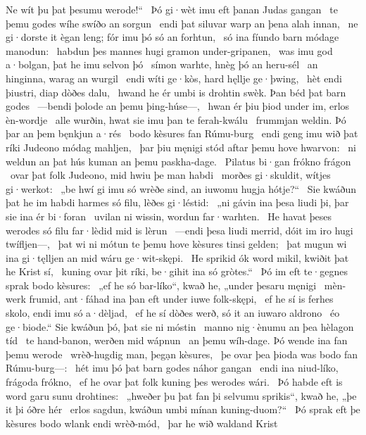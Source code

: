 Ne wít þu þat þesumu werode!“ \hld\ Þó gi·wèt imu eft þanan
Judas gangan \hld\ te þemu godes wíhe
swíðo an sorgun \hld\ endi þat siluvar warp
an þena alah innan, \hld\ ne gi·dorste it ègan leng;
fór imu þó só an forhtun, \hld\ só ina fíundo barn
módage manodun: \hld\ habdun þes mannes hugi
gramon under-gripanen, \hld\ was imu god a·bolgan,
þat he imu selvon þó \hld\ símon warhte,
hnèg þó an heru-sél \hld\ an hinginna,
warag an wurgil \hld\ endi wíti ge·kòs,
hard hęllje ge·þwing, \hld\ hèt endi þiustri,
diap dòðes dalu, \hld\ hwand he ér umbi is drohtin swèk.
Þan béd þat barn godes \hld\ —bendi þolode
an þemu þing-húse—, \hld\ hwan ér þiu þiod under im,
erlos èn-wordje \hld\ alle wurðin,
hwat sie imu þan te ferah-kwálu \hld\ frummjan weldin.
Þó þar an þem bęnkjun a·rés \hld\ bodo kèsures
fan Rúmu-burg \hld\ endi geng imu wið þat ríki Judeono
módag mahljen, \hld\ þar þiu męnigi stód
aftar þemu hove hwarvon: \hld\ ni weldun an þat hús kuman
an þemu paskha-dage. \hld\ Pilatus bi·gan
frókno frágon \hld\ ovar þat folk Judeono,
mid hwiu þe man habdi \hld\ morðes gi·skuldit,
wítjes gi·werkot: \hld\ „be hwí gi imu só wrèðe sind,
an iuwomu hugja hótje?“ \hld\ Sie kwáðun þat he im habdi harmes só filu,
lèðes gi·léstid: \hld\ „ni gávin ina þesa liudi þi,
þar sie ina ér bi·foran \hld\ uvilan ni wissin,
wordun far·warhten. \hld\ He havat þeses werodes só filu
far·lèdid mid is lèrun \hld\ —endi þesa liudi merrid,
dóit im iro hugi twífljen—, \hld\ þat wi ni mótun te þemu hove kèsures
tinsi gelden; \hld\ þat mugun wi ina gi·tęlljen an
mid wáru ge·wit-skępi. \hld\ He sprikid ók word mikil,
kwiðit þat he Krist sí, \hld\ kuning ovar þit ríki,
be·gihit ina só gròtes.“ \hld\ Þó im eft te·gegnes sprak
bodo kèsures: \hld\ „ef he só bar-líko“, kwað he,
„under þesaru męnigi \hld\ mèn-werk frumid,
ant·fáhad ina þan eft under iuwe folk-skępi, \hld\ ef he sí is ferhes skolo,
endi imu só a·dèljad, \hld\ ef he sí dòðes werð,
só it an iuwaro aldrono \hld\ éo ge·biode.“
Sie kwáðun þó, þat sie ni móstin \hld\ manno nig·ènumu
an þea hèlagon tíd \hld\ te hand-banon,
werðen mid wápnun \hld\ an þemu wíh-dage.
Þó wende ina fan þemu werode \hld\ wrèð-hugdig man,
þegạn kèsures, \hld\ þe ovar þea þioda was
bodo fan Rúmu-burg—: \hld\ hét imu þó þat barn godes
náhor gangan \hld\ endi ina niud-líko,
frágoda frókno, \hld\ ef he ovar þat folk kuning
þes werodes wári. \hld\ Þó habde eft is word garu
sunu drohtines: \hld\ „hweðer þu þat fan þi selvumu sprikis“, kwað he,
„þe it þi óðre hér \hld\ erlos sagdun,
kwáðun umbi mínan kuning-duom?“ \hld\ Þó sprak eft þe kèsures bodo
wlank endi wrèð-mód, \hld\ þar he wið waldand Krist
